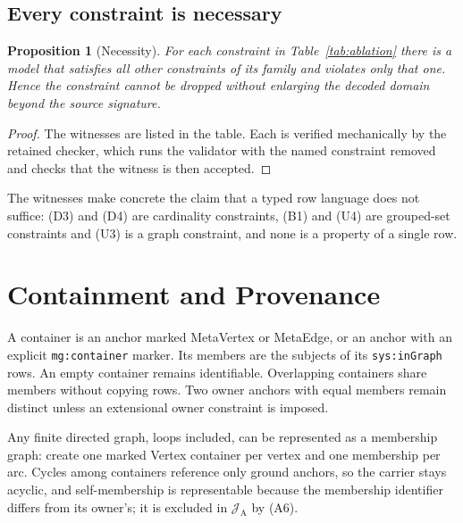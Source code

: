 \documentclass[11pt]{article}
\theoremstyle{plain}
\newtheorem{proposition}[theorem]{Proposition}
\theoremstyle{definition}
\theoremstyle{remark}
\newcommand{\mg}[1]{\texttt{mg:#1}}
\newcommand{\sys}[1]{\texttt{sys:#1}}
\newcommand{\Img}[1]{\mathcal J_{\mathrm{#1}}}
\begin{document}
\subsection{Every constraint is necessary}
\begin{table}[t]
\centering\small

\caption{Necessity of the image constraints. Each row is a store (or model) that
violates exactly the named constraint and satisfies all others of its family. The
checker verifies that the full validator rejects it and that the validator with only
that constraint removed accepts it.}
\label{tab:ablation}
\end{table}
\begin{proposition}[Necessity]\label{prop:necessity}
For each constraint in Table~\ref{tab:ablation} there is a model that satisfies all
other constraints of its family and violates only that one. Hence the constraint cannot
be dropped without enlarging the decoded domain beyond the source signature.
\end{proposition}
\begin{proof}
The witnesses are listed in the table. Each is verified mechanically by the retained
checker, which runs the validator with the named constraint removed and checks that the
witness is then accepted.
\end{proof}
The witnesses make concrete the claim that a typed row language does not suffice: (D3)
and (D4) are cardinality constraints, (B1) and (U4) are grouped-set constraints and
(U3) is a graph constraint, and none is a property of a single row.

\section{Containment and Provenance}\label{sec:contain}
A container is an anchor marked MetaVertex or MetaEdge, or an anchor with an explicit
\mg{container} marker. Its members are the subjects of its \sys{inGraph} rows. An empty
container remains identifiable. Overlapping containers share members without copying
rows. Two owner anchors with equal members remain distinct unless an extensional owner
constraint is imposed.

Any finite directed graph, loops included, can be represented as a membership graph:
create one marked Vertex container per vertex and one membership per arc. Cycles among
containers reference only ground anchors, so the carrier stays acyclic, and
self-membership is representable because the membership identifier differs from its
owner's; it is excluded in $\Img{A}$ by (A6).
\end{document}
